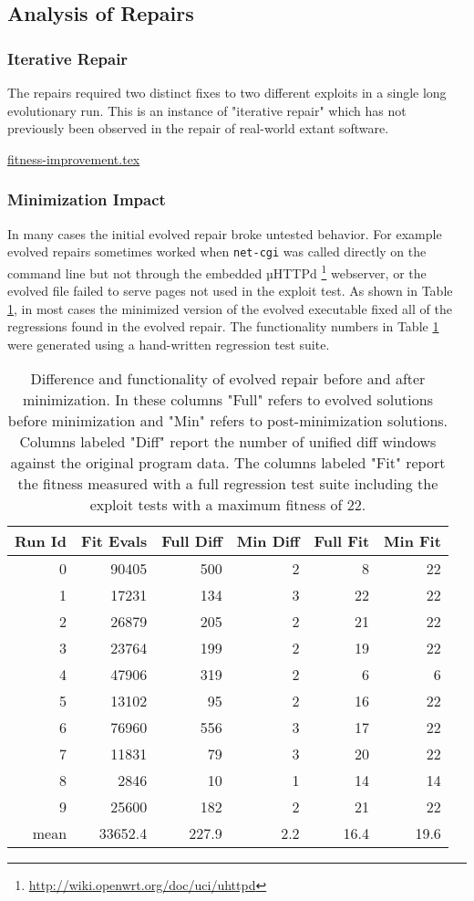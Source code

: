 \documentclass{sigcomm-alternate}
\begin{document}
\subsection{Analysis of Repairs}
\label{sec-4-2}
\subsubsection{Iterative Repair}
\label{sec-4-2-1}
The repairs required two distinct fixes to two different exploits in a
single long evolutionary run.  This is an instance of "iterative
repair" which has not previously been observed in the repair of
real-world extant software.

\url{fitness-improvement.tex}
\subsubsection{Minimization Impact}
\label{sec-4-2-2}
In many cases the initial evolved repair broke untested behavior.  For
example evolved repairs sometimes worked when \texttt{net-cgi} was called
directly on the command line but not through the embedded
µHTTPd \footnote{\url{http://wiki.openwrt.org/doc/uci/uhttpd}} webserver, or the evolved file failed to serve pages not
used in the exploit test.  As shown in Table \ref{minimized-stats}, in most
cases the minimized version of the evolved executable fixed all of the
regressions found in the evolved repair.  The functionality numbers in
Table \ref{minimized-stats} were generated using a hand-written regression
test suite.

\begin{table}[htb]
\centering
\begin{tabular}{rrrrrr}
Run Id & Fit Evals & Full Diff & Min Diff & Full Fit & Min Fit\\
\hline
0 & 90405 & 500 & 2 & 8 & 22\\
1 & 17231 & 134 & 3 & 22 & 22\\
2 & 26879 & 205 & 2 & 21 & 22\\
3 & 23764 & 199 & 2 & 19 & 22\\
4 & 47906 & 319 & 2 & 6 & 6\\
5 & 13102 & 95 & 2 & 16 & 22\\
6 & 76960 & 556 & 3 & 17 & 22\\
7 & 11831 & 79 & 3 & 20 & 22\\
8 & 2846 & 10 & 1 & 14 & 14\\
9 & 25600 & 182 & 2 & 21 & 22\\
\hline
mean & 33652.4 & 227.9 & 2.2 & 16.4 & 19.6\\
\end{tabular}\caption{\label{minimized-stats}Difference and functionality of evolved repair before and after minimization.  In these columns "Full" refers to evolved solutions before minimization and "Min" refers to post-minimization solutions.  Columns labeled "Diff" report the number of unified diff windows against the original program data. The columns labeled "Fit" report the fitness measured with a full regression test suite including the exploit tests with a maximum fitness of 22.}

\end{table}
\end{document}
